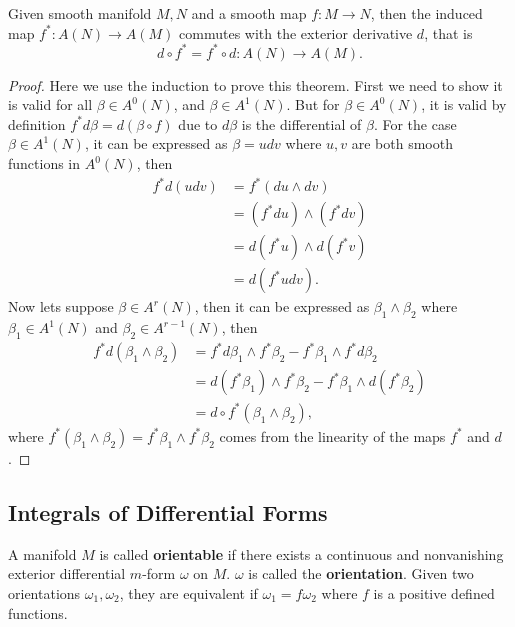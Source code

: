\begin{theorem}
Given smooth manifold $M,N$ and a smooth map $f:M\to N$, then the induced map $f^*:A(N)\to A(M)$  commutes with the exterior derivative $d$, that is
\begin{equation}
d\circ f^*=f^*\circ d: A(N)\to A(M).
\end{equation}
\end{theorem}

\begin{proof}
Here we use the induction to prove this theorem. First we need to show it is valid for all $\beta\in A^0(N)$, and $\beta\in A^1(N)$. But for $\beta\in A^0(N)$, it is valid by definition $f^*d\beta=d(\beta\circ f)$ due to $d\beta$ is the differential of $\beta$. For the case $\beta\in A^1(N)$, it can be expressed as $\beta=udv$ where $u,v$ are both smooth functions in $A^0(N)$, then
\begin{equation*}
\begin{aligned}
f^*d(udv) &=f^*(du\wedge dv)\\
&=(f^*du)\wedge(f^*dv)\\
&=d(f^*u)\wedge d(f^*v)\\
&=d(f^*udv).
\end{aligned}
\end{equation*}
Now lets suppose $\beta\in A^r(N)$, then it can be expressed as $\beta_1\wedge\beta_2$ where $\beta_1\in A^1(N)$ and $\beta_2\in A^{r-1}(N)$, then
\begin{equation*}
\begin{aligned}
f^*d(\beta_1\wedge\beta_2)&=f^*d\beta_1\wedge f^*\beta_2-f^*\beta_1\wedge f^*d\beta_2\\
&=d(f^*\beta_1)\wedge f^*\beta_2-f^*\beta_1\wedge d(f^*\beta_2)\\
&=d\circ f^*(\beta_1\wedge\beta_2),
\end{aligned}
\end{equation*}
where $f^*(\beta_1\wedge\beta_2)=f^*\beta_1\wedge f^*\beta_2$ comes from the linearity of the maps $f^*$ and $d$.
\end{proof}

\subsection{Integrals of Differential Forms}
\begin{definition}
A manifold $M$ is called \textbf{orientable} if there exists a continuous and nonvanishing exterior differential $m$-form $\omega$ on $M$. $\omega$ is called the \textbf{orientation}. Given two orientations $\omega_1,\omega_2$, they are equivalent if $\omega_1=f\omega_2$ where $f$ is a positive defined functions.
\end{definition}

